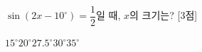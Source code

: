 $\sin(2x-10^\circ)=\dfrac{1}{2}$일 때, $x$의 크기는?  \mbox{[3점]}
\begin{choices32}{$15^\circ$}{$20^\circ$}{$27.5^\circ$}{$30^\circ$}{$35^\circ$}\end{choices32}
